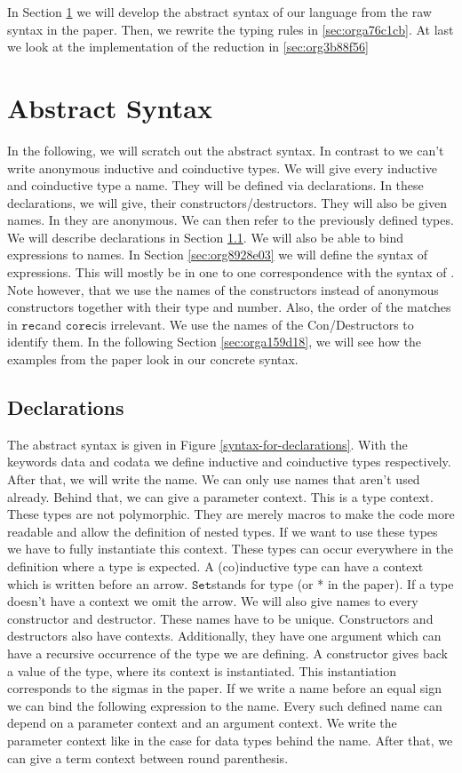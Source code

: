 \documentclass[a4paper,cleardoubleempty,BCOR1cm]{scrbook}
\begin{document}
In Section \ref{sec:orgeaf27f3} we will develop the abstract syntax of our language
from the raw syntax in the paper. Then, we rewrite the typing rules in \ref{sec:orga76c1cb}. At last we look at the implementation of the reduction in \ref{sec:org3b88f56}
\section{Abstract Syntax}
\label{sec:orgeaf27f3}
In the following, we will scratch out the abstract syntax. In contrast to
\cite{basold2016type} we can't write anonymous inductive and coinductive types.
We will give every inductive and coinductive type a name. They will be
defined via declarations. In these declarations, we will give, their
constructors/destructors. They will also be given names. In \cite{basold2016type}
they are anonymous. We can then refer to the previously defined types. We
will describe declarations in Section \ref{sec:org58f51d2}. We will also be able to
bind expressions to names. In Section \ref{sec:org8928e03} we will define the syntax
of expressions. This will mostly be in one to one correspondence with the
syntax of \cite{basold2016type}. Note however, that we use the names of the
constructors instead of anonymous constructors together with their type and
number. Also, the order of the matches in $\mathtt{rec}$\;and $\mathtt{corec}$\;is irrelevant. We use
the names of the Con/Destructors to identify them. In the following Section
\ref{sec:orga159d18}, we will see how the examples from the paper look in our concrete
syntax.
\subsection{Declarations}
\label{sec:org58f51d2}
The abstract syntax is given in Figure \ref{syntax-for-declarations}. With the
keywords data and codata we define inductive and coinductive types
respectively. After that, we will write the name. We can only use names that
aren't used already. Behind that, we can give a parameter context. This is a
type context. These types are not polymorphic. They are merely macros to make
the code more readable and allow the definition of nested types. If we want
to use these types we have to fully instantiate this context. These types can
occur everywhere in the definition where a type is expected. A (co)inductive
type can have a context which is written before an arrow. $\mathtt{Set}$\;stands for
type (or * in the paper). If a type doesn't have a context we omit the arrow.
We will also give names to every constructor and destructor. These names have
to be unique. Constructors and destructors also have contexts. Additionally,
they have one argument which can have a recursive occurrence of the type we
are defining. A constructor gives back a value of the type, where its
context is instantiated. This instantiation corresponds to the sigmas in the
paper. If we write a name before an equal sign we can bind the following
expression to the name. Every such defined name can depend on a parameter
context and an argument context. We write the parameter context like in the
case for data types behind the name. After that, we can give a term context
between round parenthesis.
\end{document}
